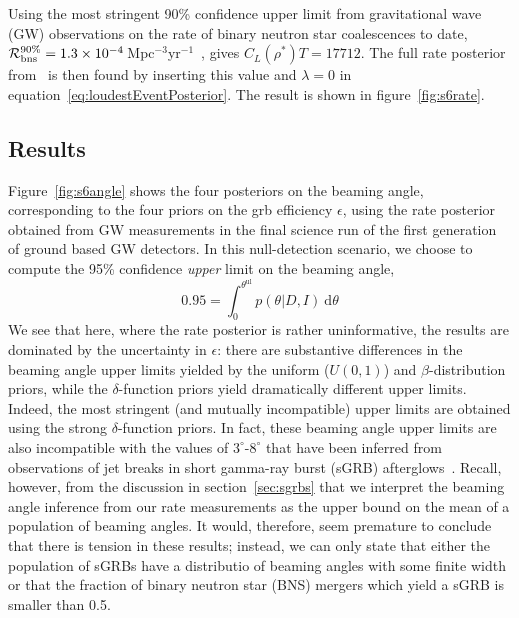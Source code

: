 \documentclass[twocolumn,nofootinbib]{revtex4-1}
\newcommand{\cbcrate}{{{\mathcal R}}}
\newcommand{\diff}{{\mathrm d}}
\newcommand{\rhostar}{{\rho^*}}
\def\bns#1{binary neutron star#1 (BNS#1)\gdef\bns{BNS}}
\def\gw#1{gravitational wave#1 (GW#1)\gdef\gw{GW}}
\def\sgrb#1{short gamma-ray burst#1 (sGRB#1)\gdef\sgrb{sGRB}}
\begin{document}
Using the most stringent 90\% confidence upper limit from \gw{} observations on
the rate of binary neutron star coalescences to date, $\cbcrate^{90\%}_{{\rm
bns}} = 1.3\times 10^{-4}$\,Mpc$^{-3}$yr$^{-1}$~\cite{S6lowmass}, gives
$C_L(\rhostar)T=17712$.  The full rate posterior from~\cite{S6lowmass} is then
found by inserting this value and $\lambda=0$ in
equation~\ref{eq:loudestEventPosterior}.  The result is shown in
figure~\ref{fig:s6rate}.



\subsection{Results}
Figure~\ref{fig:s6angle} shows the four posteriors on the beaming angle,
corresponding to the four priors on the grb efficiency $\epsilon$, using the
rate posterior obtained from \gw{} measurements in the final science run of the
first generation of ground based \gw{} detectors.  In this null-detection
scenario, we choose to compute the 95\% confidence \emph{upper} limit on the
beaming angle,
\begin{equation}
    \label{eq:beaming_upper_limit}
    0.95 = \int_0^{\theta^{\mathrm{ul}}} p(\theta|D,I)~\diff \theta
\end{equation}
%
We see that here, where the rate posterior is rather uninformative, the results
are dominated by the uncertainty in $\epsilon$: there are substantive
differences in the beaming angle upper limits yielded by the uniform ($U(0,1)$)
and $\beta$-distribution priors, while the $\delta$-function priors yield
dramatically different upper limits.  Indeed, the most stringent (and mutually
incompatible) upper limits are obtained using the strong $\delta$-function
priors.  In fact, these beaming angle upper limits are also incompatible with
the values of $3^{\circ}\mbox{-}8^{\circ}$ that have been inferred from
observations of jet breaks in \sgrb{} afterglows~\cite{2014ApJ...780..118F,
2006MNRAS.367L..42P, 2012A&A...538L...7N}.  Recall, however, from the discussion
in section~\ref{sec:sgrbs} that we interpret the beaming angle inference from
our rate measurements as the upper bound on the mean of a population of beaming
angles.  It would, therefore, seem premature to conclude that there is tension
in these results; instead, we can only state that either the population of
\sgrb{s} have a distributio of beaming angles with some finite width or that the
fraction of \bns{} mergers which yield a \sgrb{} is smaller than 0.5.
\end{document}
